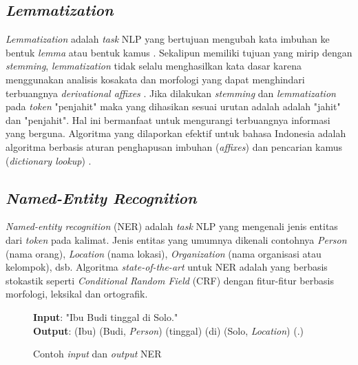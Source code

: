 
\subsection{\textit{Lemmatization}}

\textit{Lemmatization} adalah \textit{task} NLP yang bertujuan mengubah kata imbuhan ke bentuk \textit{lemma} atau bentuk kamus \citep{suhartono2014lemmatization}. Sekalipun memiliki tujuan yang mirip dengan \textit{stemming}, \textit{lemmatization} tidak selalu menghasilkan kata dasar karena menggunakan analisis kosakata dan morfologi yang dapat menghindari terbuangnya \textit{derivational affixes} \citep{manning2008introduction}. Jika dilakukan \textit{stemming} dan \textit{lemmatization} pada \textit{token} "penjahit" maka yang dihasikan sesuai urutan adalah adalah "jahit" dan "penjahit". Hal ini bermanfaat untuk mengurangi terbuangnya informasi yang berguna. Algoritma yang dilaporkan efektif untuk bahasa Indonesia adalah algoritma berbasis aturan penghapusan imbuhan (\textit{affixes}) dan pencarian kamus (\textit{dictionary lookup}) \citep{suhartono2014lemmatization}.

\subsection{\textit{Named-Entity Recognition}}

\textit{Named-entity recognition} (NER) adalah \textit{task} NLP yang mengenali jenis entitas dari \textit{token} pada kalimat. Jenis entitas yang umumnya dikenali contohnya \textit{Person} (nama orang), \textit{Location} (nama lokasi), \textit{Organization} (nama organisasi atau kelompok), dsb. Algoritma \textit{state-of-the-art} untuk NER adalah yang berbasis stokastik seperti \textit{Conditional Random Field} (CRF) dengan fitur-fitur berbasis morfologi, leksikal dan ortografik.

\begin{figure}
	\begin{mdframed}
		\textbf{Input}: "Ibu Budi tinggal di Solo." \\		
		\textbf{Output}: (Ibu) (Budi, \textit{Person}) (tinggal) (di) (Solo, \textit{Location}) (.)
	\end{mdframed}
	\caption{Contoh \textit{input} dan \textit{output} NER}
	\label{fig:example_ner}
\end{figure}


